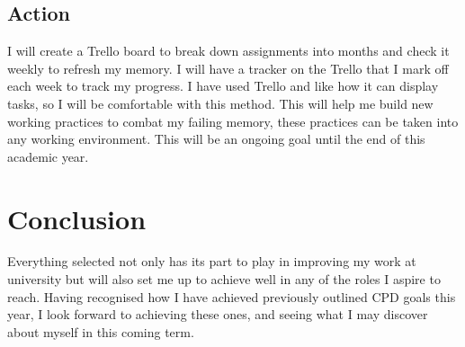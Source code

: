 \documentclass{scrartcl}
\begin{document}
\subsection{Action}
I will create a Trello board to break down assignments into months and check it weekly to refresh my memory. I will have a tracker on the Trello that I mark off each week to track my progress. I have used Trello and like how it can display tasks, so I will be comfortable with this method. This will help me build new working practices to combat my failing memory, these practices can be taken into any working environment. This will be an ongoing goal until the end of this academic year.

\section{Conclusion}
Everything selected not only has its part to play in improving my work at university but will also set me up to achieve well in any of the roles I aspire to reach. Having recognised how I have achieved previously outlined CPD goals this year, I look forward to achieving these ones, and seeing what I may discover about myself in this coming term. 
\end{document}
